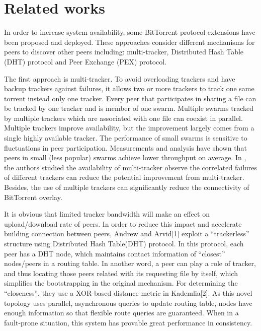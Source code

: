\documentclass[conference]{IEEEtran}
\begin{document}
	\section{Related works}
	In order to increase system availability, some BitTorrent protocol extensions have been proposed and deployed. These approaches consider different mechanisms for peers to discover other peers including: multi-tracker, Distributed Hash Table (DHT) protocol and Peer Exchange (PEX) protocol.
	
	The first approach is multi-tracker. To avoid overloading trackers and have backup trackers against failures, it allows two or more trackers to track one same torrent instead only one tracker. Every peer that participates in sharing a file can be tracked by one tracker and is member of one swarm. Multiple swarms tracked by multiple trackers which are associated with one file can coexist in parallel.  Multiple trackers improve availability, but the improvement largely comes from a single highly available tracker. The performance of small swarms is sensitive to fluctuations in peer participation. Measurements and analysis have shown that peers in small (less popular) swarms achieve lower throughput on average\cite{Swarming}. In \cite{Availability}, the authors studied the availability of multi-tracker observe the correlated failures of different trackers can reduce the potential improvement from multi-tracker. Besides, the use of multiple trackers can significantly reduce the connectivity of BitTorrent overlay.
	
	It is obvious that limited tracker bandwidth will make an effect on upload/download rate of peers. In order to reduce this impact and accelerate building connection between peers, Andrew and Arvid[1] exploit a “trackerless” structure using Distributed Hash Table(DHT) protocol. In this protocol, each peer has a DHT node, which maintains contact information of “closest” nodes/peers in a routing table. In another word, a peer can play a role of tracker, and thus locating those peers related with its requesting file by itself, which simplifies the bootstrapping in the original mechanism. For determining the “closeness”, they use a XOR-based distance metric in Kademlia[2]. As this novel topology uses parallel, asynchronous queries to update routing table, nodes have enough information so that flexible route queries are guaranteed. When in a fault-prone situation, this system has provable great performance in consistency.
	
\end{document}

